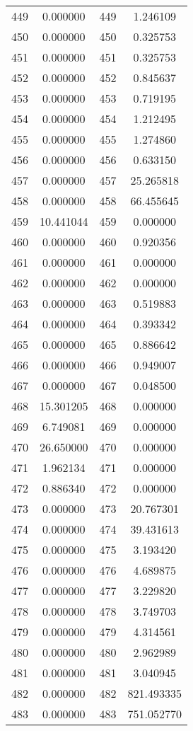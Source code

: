 \documentclass[12pt]{article}
\begin{document}
\begin{longtable}{@{}cccc@{}}
449 & 0.000000 & 449 & 1.246109 \\
450 & 0.000000 & 450 & 0.325753 \\
451 & 0.000000 & 451 & 0.325753 \\
452 & 0.000000 & 452 & 0.845637 \\
453 & 0.000000 & 453 & 0.719195 \\
454 & 0.000000 & 454 & 1.212495 \\
455 & 0.000000 & 455 & 1.274860 \\
456 & 0.000000 & 456 & 0.633150 \\
457 & 0.000000 & 457 & 25.265818 \\
458 & 0.000000 & 458 & 66.455645 \\
459 & 10.441044 & 459 & 0.000000 \\
460 & 0.000000 & 460 & 0.920356 \\
461 & 0.000000 & 461 & 0.000000 \\
462 & 0.000000 & 462 & 0.000000 \\
463 & 0.000000 & 463 & 0.519883 \\
464 & 0.000000 & 464 & 0.393342 \\
465 & 0.000000 & 465 & 0.886642 \\
466 & 0.000000 & 466 & 0.949007 \\
467 & 0.000000 & 467 & 0.048500 \\
468 & 15.301205 & 468 & 0.000000 \\
469 & 6.749081 & 469 & 0.000000 \\
470 & 26.650000 & 470 & 0.000000 \\
471 & 1.962134 & 471 & 0.000000 \\
472 & 0.886340 & 472 & 0.000000 \\
473 & 0.000000 & 473 & 20.767301 \\
474 & 0.000000 & 474 & 39.431613 \\
475 & 0.000000 & 475 & 3.193420 \\
476 & 0.000000 & 476 & 4.689875 \\
477 & 0.000000 & 477 & 3.229820 \\
478 & 0.000000 & 478 & 3.749703 \\
479 & 0.000000 & 479 & 4.314561 \\
480 & 0.000000 & 480 & 2.962989 \\
481 & 0.000000 & 481 & 3.040945 \\
482 & 0.000000 & 482 & 821.493335 \\
483 & 0.000000 & 483 & 751.052770 \\

\end{longtable}
\end{document}
